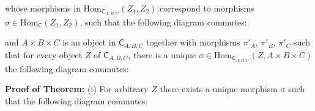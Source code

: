 \documentclass[11pt,a4paper]{article}
\newcommand{\morph}[3]{\text{Hom}_{#1}(#2,#3)}
\begin{document}
\begin{center}
\end{center}

\noindent whose morphisms in $\morph{\textsf{C}_{A,B,C}}{Z_1}{Z_2}$ correspond to morphisms $\sigma \in \morph{\textsf{C}}{Z_1}{Z_2}$, such that the following diagram commutes:

\begin{center}
\end{center}

\noindent and $A \times B \times C$ is an object in $\textsf{C}_{A,B,C}$ together with morphisms $\pi'_A$, $\pi'_B$, $\pi'_C$ such that for every object $Z$ of $\textsf{C}_{A,B,C}$, there is a unique $\sigma \in \morph{\textsf{C}_{A,B,C}}{Z}{A \times B \times C}$ the following diagram commutes: \\

\begin{center}
\end{center}


\noindent \textbf{Proof of Theorem:} (i) For arbitrary $Z$ there exists a unique morphism $\sigma$ such that the following diagram commutes:

\begin{center}
\end{center}
\end{document}
